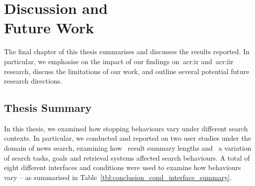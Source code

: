 
\chapter[Discussion and Future Work]{Discussion and\\Future Work}\label{chap:conclusions}
The final chapter of this thesis summarises and discusses the results reported. In particular, we emphasise on the impact of our findings on~\gls{acr:ir} and~\gls{acr:iir} research, discuss the limitations of our work, and outline several potential future research directions.

\section{Thesis Summary}\label{sec:conclusions:summary}
In this thesis, we examined how stopping behaviours vary under different search contexts. In particular, we conducted and reported on two user studies under the domain of news search, examining how~ result summary lengths and~ a variation of search tasks, goals and retrieval systems affected search behaviours. A total of eight different interfaces and conditions were used to examine how behaviours vary -- as summarised in Table~\ref{tbl:conclusion_cond_interface_summary}.


